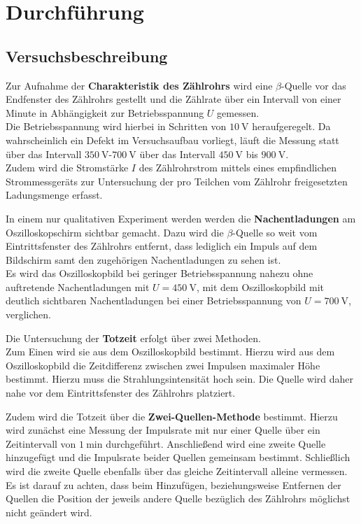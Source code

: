 \section{Durchführung}
\label{sec:Durchführung}



\subsection{Versuchsbeschreibung}
\label{sec:Versuchsbeschreibung}
Zur Aufnahme der \textbf{Charakteristik des Zählrohrs} wird eine $\beta$-Quelle vor das Endfenster des Zählrohrs gestellt und die Zählrate über ein Intervall von einer Minute in Abhängigkeit zur Betriebsspannung $U$ gemessen.\\
Die Betriebsspannung wird hierbei in Schritten von $\SI{10}{\volt}$ heraufgeregelt.
Da wahrscheinlich ein Defekt im Versuchsaufbau vorliegt, läuft die Messung statt über das Intervall $\SI{350}{\volt}$-$\SI{700}{\volt}$ über das Intervall $\SI{450}{\volt}$ bis $\SI{900}{\volt}$.\\
Zudem wird die Stromstärke $I$ des Zählrohrstrom mittels eines empfindlichen Strommessgeräts zur Untersuchung der pro Teilchen vom Zählrohr freigesetzten Ladungsmenge erfasst.

In einem nur qualitativen Experiment werden werden die \textbf{Nachentladungen} am Oszilloskopschirm sichtbar gemacht.
Dazu wird die $\beta$-Quelle so weit vom Eintrittsfenster des Zählrohrs entfernt, dass lediglich ein Impuls auf dem Bildschirm samt den zugehörigen Nachentladungen zu sehen ist.\\
Es wird das Oszilloskopbild bei geringer Betriebsspannung nahezu ohne auftretende Nachentladungen mit $U=\SI{450}{\volt}$, mit dem Oszilloskopbild mit deutlich sichtbaren Nachentladungen bei einer Betriebsspannung von $U=\SI{700}{\volt}$, verglichen.

Die Untersuchung der \textbf{Totzeit} erfolgt über zwei Methoden.\\
Zum Einen wird sie aus dem Oszilloskopbild bestimmt.
Hierzu wird aus dem Oszilloskopbild die Zeitdifferenz zwischen zwei Impulsen maximaler Höhe bestimmt. Hierzu muss die Strahlungsintensität hoch sein. Die Quelle wird daher nahe vor dem Eintrittsfenster des Zählrohrs platziert.

Zudem wird die Totzeit über die \textbf{Zwei-Quellen-Methode} bestimmt.
Hierzu wird zunächst eine Messung der Impulsrate mit nur einer Quelle über ein Zeitintervall von $\SI{1}{\minute}$ durchgeführt.
Anschließend wird eine zweite Quelle hinzugefügt und die Impulsrate beider Quellen gemeinsam bestimmt. Schließlich wird die zweite Quelle ebenfalls über das gleiche Zeitintervall alleine vermessen.
Es ist darauf zu achten, dass beim Hinzufügen, beziehungsweise Entfernen der Quellen die Position der jeweils andere Quelle bezüglich des Zählrohrs möglichst nicht geändert wird.
